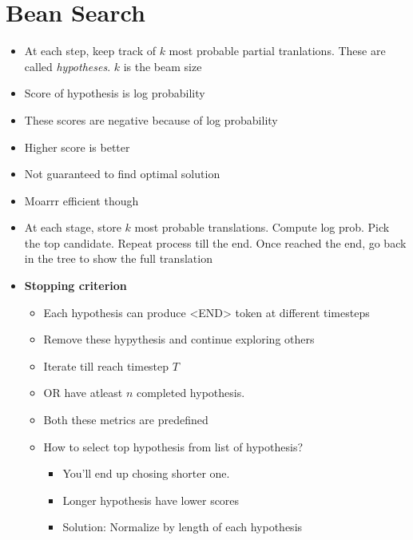 \documentclass[a4paper]{article}
\begin{document}
\section{Bean Search}
\begin{itemize}
    \item At each step, keep track of $k$ most probable partial tranlations. These are called \textit{hypotheses}. $k$ is the beam size 
    \item Score of hypothesis is log probability
    \item These scores are negative because of log probability
    \item Higher score is better
    \item Not guaranteed to find optimal solution
    \item Moarrr efficient though
    \item At each stage, store $k$ most probable translations. Compute log prob. Pick the top candidate. Repeat process till the end. Once reached the end, go back in the tree to show the full translation
    \item \textbf{Stopping criterion}  
    \begin{itemize}
        \item Each hypothesis can produce <END> token at different timesteps
        \item Remove these hypythesis and continue exploring others
        \item Iterate till reach timestep $T$ 
        \item OR have atleast $n$ completed hypothesis.
        \item Both these metrics are predefined
        \item How to select top hypothesis from list of hypothesis?
        \begin{itemize}
            \item You'll end up chosing shorter one.
            \item Longer hypothesis have lower scores
            \item Solution: Normalize by length of each hypothesis
        \end{itemize}
    \end{itemize}

\end{itemize}
\end{document}
